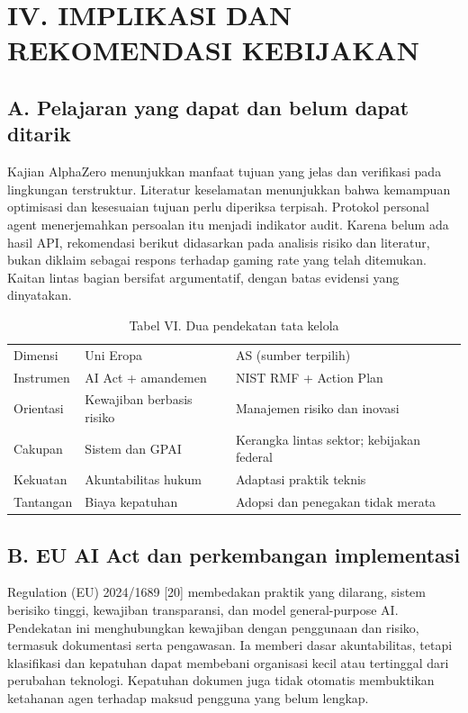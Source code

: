 \documentclass[conference,a4paper]{IEEEtran}
\begin{document}
\clearpage
\section*{IV. IMPLIKASI DAN REKOMENDASI KEBIJAKAN}
\subsection*{A. Pelajaran yang dapat dan belum dapat ditarik}
Kajian AlphaZero menunjukkan manfaat tujuan yang jelas dan verifikasi pada lingkungan terstruktur. Literatur keselamatan menunjukkan bahwa kemampuan optimisasi dan kesesuaian tujuan perlu diperiksa terpisah. Protokol personal agent menerjemahkan persoalan itu menjadi indikator audit. Karena belum ada hasil API, rekomendasi berikut didasarkan pada analisis risiko dan literatur, bukan diklaim sebagai respons terhadap gaming rate yang telah ditemukan. Kaitan lintas bagian bersifat argumentatif, dengan batas evidensi yang dinyatakan.

\begin{table}[ht]\caption{Tabel VI. Dua pendekatan tata kelola}\centering\scriptsize\begin{tabular}{p{}p{}p{}}\hline
Dimensi & Uni Eropa & AS (sumber terpilih)\\
Instrumen & AI Act + amandemen & NIST RMF + Action Plan\\
Orientasi & Kewajiban berbasis risiko & Manajemen risiko dan inovasi\\
Cakupan & Sistem dan GPAI & Kerangka lintas sektor; kebijakan federal\\
Kekuatan & Akuntabilitas hukum & Adaptasi praktik teknis\\
Tantangan & Biaya kepatuhan & Adopsi dan penegakan tidak merata\\\hline\end{tabular}\end{table}
\subsection*{B. EU AI Act dan perkembangan implementasi}
Regulation (EU) 2024/1689 [20] membedakan praktik yang dilarang, sistem berisiko tinggi, kewajiban transparansi, dan model general-purpose AI. Pendekatan ini menghubungkan kewajiban dengan penggunaan dan risiko, termasuk dokumentasi serta pengawasan. Ia memberi dasar akuntabilitas, tetapi klasifikasi dan kepatuhan dapat membebani organisasi kecil atau tertinggal dari perubahan teknologi. Kepatuhan dokumen juga tidak otomatis membuktikan ketahanan agen terhadap maksud pengguna yang belum lengkap.
\end{document}
